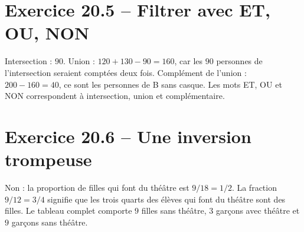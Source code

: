 \section*{Exercice 20.5 -- Filtrer avec ET, OU, NON}
Intersection : $90$. Union : $120+130-90=160$, car les $90$ personnes de l'intersection seraient comptées deux fois. Complément de l'union : $200-160=40$, ce sont les personnes de B sans casque. Les mots ET, OU et NON correspondent à intersection, union et complémentaire.

\section*{Exercice 20.6 -- Une inversion trompeuse}
Non : la proportion de filles qui font du théâtre est $9/18=1/2$. La fraction $9/12=3/4$ signifie que les trois quarts des élèves qui font du théâtre sont des filles. Le tableau complet comporte $9$ filles sans théâtre, $3$ garçons avec théâtre et $9$ garçons sans théâtre.
